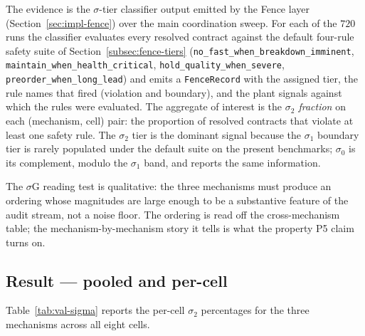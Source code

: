 The evidence is the $\sigma$-tier classifier output emitted by the
Fence layer (Section~\ref{sec:impl-fence}) over the main coordination
sweep. For each of the $720$ runs the classifier evaluates every
resolved contract against the default four-rule safety suite of
Section~\ref{subsec:fence-tiers}
(\texttt{no\_fast\_when\_breakdown\_imminent},
\texttt{maintain\_when\_health\_critical},
\texttt{hold\_quality\_when\_severe},
\texttt{preorder\_when\_long\_lead}) and emits a
\texttt{FenceRecord} with the assigned tier, the rule names that
fired (violation and boundary), and the plant signals against which
the rules were evaluated. The aggregate of interest is the
\emph{$\sigma_2$ fraction} on each (mechanism, cell) pair: the
proportion of resolved contracts that violate at least one safety
rule. The $\sigma_2$ tier is the dominant signal because the
$\sigma_1$ boundary tier is rarely populated under the default suite
on the present benchmarks; $\sigma_0$ is its complement, modulo the
$\sigma_1$ band, and reports the same information.

The $\sigma$G reading test is qualitative: the three mechanisms must
produce an ordering whose magnitudes are large enough to be a
substantive feature of the audit stream, not a noise floor. The
ordering is read off the cross-mechanism table; the
mechanism-by-mechanism story it tells is what the property P5 claim
turns on.

\subsection*{Result --- pooled and per-cell}

Table~\ref{tab:val-sigma} reports the per-cell $\sigma_2$ percentages
for the three mechanisms across all eight cells.

